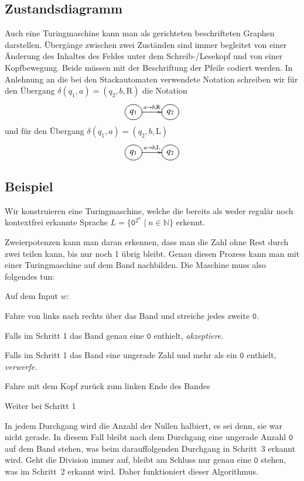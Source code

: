 \subsection{Zustandsdiagramm}
Auch eine Turingmaschine kann man als gerichteten beschrifteten Graphen
darstellen. Übergänge zwischen zwei Zuständen sind immer begleitet von
einer Änderung des Inhaltes des Feldes unter dem Schreib-/Lesekopf
und von einer Kopfbewegung. Beide müssen mit der Beschriftung
der Pfeile codiert werden. In Anlehnung an die bei den Stackautomaten
verwendete Notation schreiben wir für den Übergang
$\delta(q_1,a)=(q_2,b,\text{R})$
die Notation
\[
\entrymodifiers={++[o][F]}
\xymatrix{
{q_1}\ar[r]^{a\to b,\text{R}}
	&{q_2}
}
\]
und für den Übergang
$\delta(q_1,a)=(q_2,b,\text{L})$
\[
\entrymodifiers={++[o][F]}
\xymatrix{
{q_1}\ar[r]^{a\to b,\text{L}}
	&{q_2}
}
\]

\subsection{Beispiel}
Wir konstruieren eine Turingmaschine, welche die bereits als weder regulär
noch kontextfrei erkannte Sprache $L=\{\texttt{0}^{2^n}\;|\; n\in\mathbb N\}$
erkennt.

Zweierpotenzen kann man daran erkennen, dass man die Zahl ohne
Rest durch zwei teilen kann, bis nur noch 1 übrig bleibt. Genau
diesen Prozess kann man mit einer Turingmaschine auf dem Band
nachbilden. Die Maschine muss also folgendes tun:

Auf dem Input $w$:
\begin{compactenum}
\item Fahre von links nach rechts über das Band und streiche jedes zweite $\texttt{0}$.
\item Falls im Schritt 1 das Band genau eine $\texttt{0}$ enthielt, {\it akzeptiere}.
\item Falls im Schritt 1 das Band eine ungerade Zahl und mehr als ein $\texttt{0}$
enthielt, {\it verwerfe}.
\item Fahre mit dem Kopf zurück zum linken Ende des Bandes
\item Weiter bei Schritt 1
\end{compactenum}
In jedem Durchgang wird die Anzahl der Nullen halbiert, es sei denn,
sie war nicht gerade. In diesem Fall bleibt nach dem Durchgang eine
ungerade Anzahl $\texttt{0}$ auf dem Band stehen, was beim darauffolgenden Durchgang
in Schritt~3 erkannt wird. Geht die Division immer auf, bleibt am Schluss
nur genau eine $\texttt{0}$ stehen, was im Schritt~2 erkannt wird. Daher funktioniert
dieser Algorithmus.


